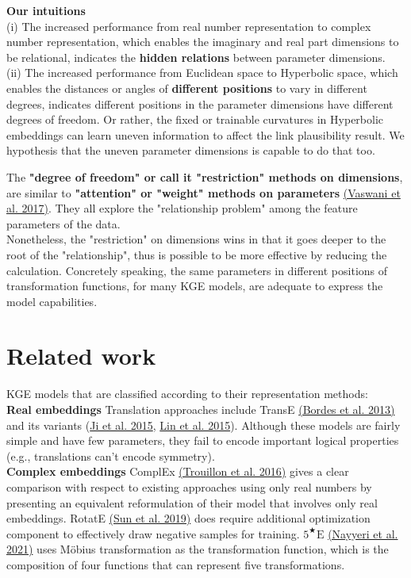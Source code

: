 \documentclass[9pt]{ctexart}
\theoremstyle{definition}
\begin{document}
\textbf{Our intuitions}\\ 
(i) The increased performance from real number representation to complex number representation, which enables the imaginary and real part dimensions to be relational, indicates the \textbf{hidden relations} between parameter dimensions.\\
(ii) The increased performance from Euclidean space to Hyperbolic space, which enables the distances or angles of \textbf{different positions} to vary in different degrees, indicates different positions in the parameter dimensions have different degrees of freedom. 
Or rather, the fixed or trainable curvatures in Hyperbolic embeddings can learn uneven information to affect the link plausibility result. 
We hypothesis that the uneven parameter dimensions is capable to do that too.

The \textbf{"degree of freedom" or call it "restriction" methods on dimensions}, are similar to \textbf{"attention" or "weight" methods on parameters}
\hyperlink{Vas17}{(Vaswani et al. 2017)}.
They all explore the "relationship problem" among the feature parameters of the data.\\
Nonetheless, the "restriction" on dimensions wins in that it goes deeper to the root of the "relationship", thus is possible to be more effective by reducing the calculation.
Concretely speaking, the same parameters in different positions of transformation functions, for many KGE models, are adequate to express the model capabilities.

\section{Related work}
KGE models that are classified according to their representation methods:\\
\textbf{Real embeddings} Translation approaches include TransE 
\hyperlink{Bor13}{(Bordes et al. 2013)} 
and its variants 
(\hyperlink{Jie15}{Ji et al. 2015}, 
\hyperlink{Lin15}{Lin et al. 2015}).
Although these models are fairly simple and have few parameters, they fail to encode important logical properties (e.g., translations can't encode symmetry).\\
\textbf{Complex embeddings} ComplEx \hyperlink{Tro16}{(Trouillon et al. 2016)} gives a clear comparison with respect to existing approaches using only real numbers by presenting an equivalent reformulation of their model that involves only real embeddings.
RotatE \hyperlink{Sun19}{(Sun et al. 2019)} does require additional optimization component to effectively draw negative samples for training.
$5^{\bigstar}\mathrm{E}$ 
\hyperlink{Nay21}{(Nayyeri et al. 2021)}
uses Möbius transformation as the transformation function, which is the composition of four functions that can represent five transformations. 
\end{document}
